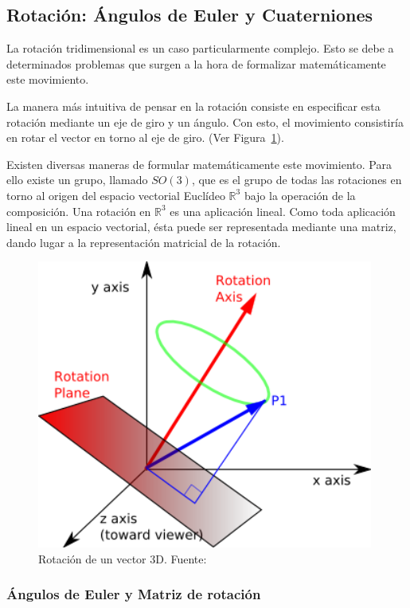 \subsection{Rotación: Ángulos de Euler y Cuaterniones}
\label{makereference5.4.2}

La rotación tridimensional es un caso particularmente complejo. Esto se debe a
determinados problemas que surgen a la hora de formalizar matemáticamente este
movimiento. 

La manera más intuitiva de pensar en la rotación consiste en especificar esta
rotación mediante un eje de giro y un ángulo. Con esto, el movimiento
consistiría en rotar el vector en torno al eje de giro. (Ver
Figura~\ref{fig:rotacion}). 

Existen diversas maneras de formular matemáticamente este movimiento. Para ello
existe un grupo, llamado $SO(3)$, que es el grupo de todas las rotaciones en
torno al origen del espacio vectorial Euclídeo $\mathbb{R}^3$ bajo la operación
de la composición. Una rotación en $\mathbb{R}^3$ es una aplicación lineal. Como
toda aplicación lineal en un espacio vectorial, ésta puede ser representada
mediante una matriz, dando lugar a la representación matricial de la rotación.

\begin{figure}
	\centering		
	\includegraphics[height=9.5cm]{figures/rotation.png}
	\caption[Rotación de un vector 3D.]{Rotación de un vector 3D.
	Fuente:~\cite{rotationimage}}
	\label{fig:rotacion}
\end{figure}

\subsubsection{Ángulos de Euler y Matriz de rotación}
\label{makereference5.4.2.1}

